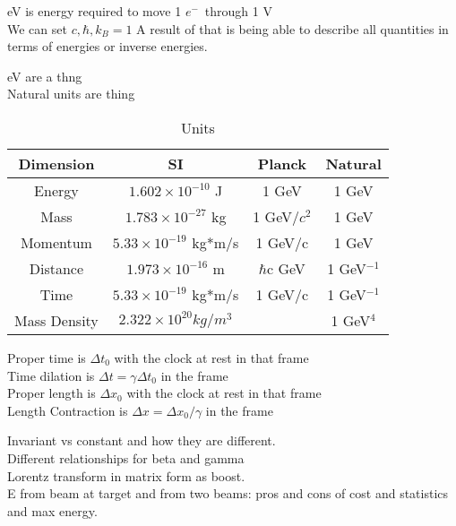 \documentclass{article}
\date{Winter Semester 2022}
\author{\EC}
\def\elec{$e^{-}$\ }
\begin{document}
\maketitle

\begin{lecture}
    eV is energy required to move 1 \elec through 1 V \\
    We can set $c,\hbar,k_B=1$ A result of that is being able to describe all quantities in terms of energies or inverse energies. 
\end{lecture}
\begin{lecture}
    eV are a thng\\
    Natural units are thing
    \begin{table}[H]
        \centering
        \begin{tabular}{|c|c|c|c|}
            \hline
            Dimension & SI & Planck & Natural 
            \\\hline
            Energy & $1.602\times10^{-10}$ J & 1 GeV & 1 GeV \\\hline
            Mass & $1.783\times10^{-27}$ kg & 1 GeV/$c^2$ & 1 GeV\\\hline
            Momentum & $5.33\times10^{-19}$ kg*m/s & 1 GeV/c & 1 GeV\\\hline
            Distance & $1.973\times10^{-16}$ m & $\hbar$c GeV & 1 GeV$^{-1}$\\\hline
            Time & $5.33\times10^{-19}$ kg*m/s & 1 GeV/c & 1 GeV$^{-1}$\\\hline
            Mass Density & $2.322\times10^{20} kg/m^{3}$ & & 1 GeV$^4$
            \\\hline
        \end{tabular}
        \caption{Units}
        \label{tab:units}
    \end{table}
    \noindent Proper time is $\Delta t_0$ with the clock at rest in that frame
    \\
    Time dilation is $\Delta t =\gamma\Delta t_0$ in the frame
    \\
    Proper length is $\Delta x_0$ with the clock at rest in that frame
    \\
    Length Contraction is $\Delta x =\Delta x_0/\gamma$ in the frame
\end{lecture}
\begin{lecture}
    Invariant vs constant and how they are different. 
    \\
    Different relationships for beta and gamma
    \\
    Lorentz transform in matrix form as boost.
    \\
    E from beam at target and from two beams: pros and cons of cost and statistics and max energy. 
\end{lecture}
\end{document}
